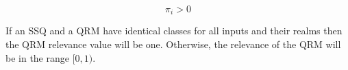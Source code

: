 \begin{equation}
\label{piconstraint2}
{\pi}_i > 0
\end{equation}

If an SSQ and a QRM have identical classes for all inputs and their
realms then the QRM relevance value will be one. Otherwise, the
relevance of the QRM will be in the range $[0, 1)$.


